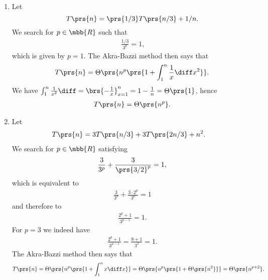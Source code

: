 \documentclass[oneside]{scrbook}
\theoremstyle{definition}
\begin{document}
\begin{exercise}
\begin{enumerate}[label = \alph*.]
\item %
Let
\[T\prs{n} = \prs{1/3} T\prs{n/3} + 1/n \text{.}\]
We search for $p \in \mbb{R}$ such that
\begin{align*}
\frac{1/3}{3^p} = 1 \text{,}
\end{align*}
which is given by $p=1$.
The Akra-Bazzi method then says that
\begin{align*}
T\prs{n} = \Theta\prs{n^p \prs{1 + \int_1^n \frac{1}{x} \diff x^2}} \text{.}
\end{align*}
We have $\int_1^n \frac{1}{x^2} \diff = \brs{- \frac{1}{x}}_{x=1}^n = 1 - \frac{1}{n} = \Theta\prs{1}$, hence
\begin{align*}
T\prs{n} = \Theta\prs{n^p} \text{.}
\end{align*}

\item %

Let
\begin{align*}
T\prs{n} &= 3T\prs{n/3} + 3T\prs{2n / 3} + n^2 \text{.}
\end{align*}
We search for $p \in \mbb{R}$ satisfying
\begin{align*}
\frac{3}{3^p} + \frac{3}{\prs{3/2}^p} = 1 \text{,}
\end{align*}
which is equivalent to
\begin{align*}
\frac{3}{3^p} + \frac{3 \cdot 2^p}{3^p} = 1
\end{align*}
and therefore to
\begin{align*}
\frac{2^p + 1}{3^{p-1}} = 1 \text{.}
\end{align*}
For $p = 3$ we indeed have
\begin{align*}
\frac{2^p + 1}{3^{p-1}} = \frac{8+1}{3^2} = 1 \text{.}
\end{align*}
The Akra-Bazzi method then says that
\begin{align*}
T\prs{n} = \Theta\prs{n^p \prs{1 + \int_1^n x \diff x}} = \Theta\prs{n^p \prs{1 + \Theta\prs{n^2}}} = \Theta\prs{n^{p+2}} \text{.}
\end{align*}

\end{enumerate}
\end{exercise}
\end{document}
